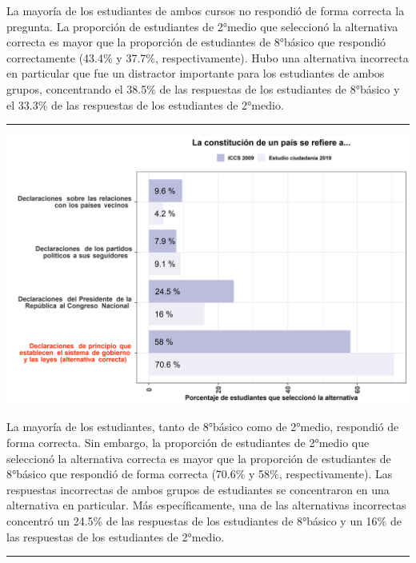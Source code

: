 \documentclass[
  14pt,
]{book}
\let\origfigure\figure
\let\endorigfigure\endfigure
\renewenvironment{figure}[1][2] {
  \expandafter\origfigure\expandafter[H]
} {
  \endorigfigure
}
\begin{document}
La mayoría de los estudiantes de ambos cursos no respondió de forma correcta la pregunta. La proporción de estudiantes de 2°medio que seleccionó la alternativa correcta es mayor que la proporción de estudiantes de 8°básico que respondió correctamente (43.4\% y 37.7\%, respectivamente). Hubo una alternativa incorrecta en particular que fue un distractor importante para los estudiantes de ambos grupos, concentrando el 38.5\% de las respuestas de los estudiantes de 8°básico y el 33.3\% de las respuestas de los estudiantes de 2°medio.

\begin{center}\rule{0.5\linewidth}{0.5pt}\end{center}

\begin{figure}[!ht]

{\centering \includegraphics[width=0.8\linewidth,]{images/graph_p2} 

}

\caption{Comparación con ICCS: Definiciones de constitución}\label{fig:unnamed-chunk-20}
\end{figure}

La mayoría de los estudiantes, tanto de 8°básico como de 2°medio, respondió de forma correcta. Sin embargo, la proporción de estudiantes de 2°medio que seleccionó la alternativa correcta es mayor que la proporción de estudiantes de 8°básico que respondió de forma correcta (70.6\% y 58\%, respectivamente). Las respuestas incorrectas de ambos grupos de estudiantes se concentraron en una alternativa en particular. Más específicamente, una de las alternativas incorrectas concentró un 24.5\% de las respuestas de los estudiantes de 8°básico y un 16\% de las respuestas de los estudiantes de 2°medio.

\begin{center}\rule{0.5\linewidth}{0.5pt}\end{center}
\end{document}
